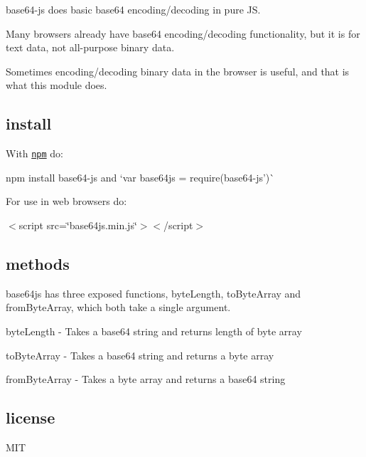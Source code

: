 {\ttfamily base64-\/js} does basic base64 encoding/decoding in pure JS.

\href{http://travis-ci.org/beatgammit/base64-js}{\tt }

\href{https://ci.testling.com/beatgammit/base64-js}{\tt }

Many browsers already have base64 encoding/decoding functionality, but it is for text data, not all-\/purpose binary data.

Sometimes encoding/decoding binary data in the browser is useful, and that is what this module does.

\subsection*{install}

With \href{https://npmjs.org}{\tt npm} do\+:

{\ttfamily npm install base64-\/js} and `var base64js = require(\textquotesingle{}base64-\/js')\`{}

For use in web browsers do\+:

{\ttfamily $<$script src=\char`\"{}base64js.\+min.\+js\char`\"{}$>$$<$/script$>$}

\subsection*{methods}

{\ttfamily base64js} has three exposed functions, {\ttfamily byte\+Length}, {\ttfamily to\+Byte\+Array} and {\ttfamily from\+Byte\+Array}, which both take a single argument.


\begin{DoxyItemize}
\item {\ttfamily byte\+Length} -\/ Takes a base64 string and returns length of byte array
\item {\ttfamily to\+Byte\+Array} -\/ Takes a base64 string and returns a byte array
\item {\ttfamily from\+Byte\+Array} -\/ Takes a byte array and returns a base64 string
\end{DoxyItemize}

\subsection*{license}

M\+IT 